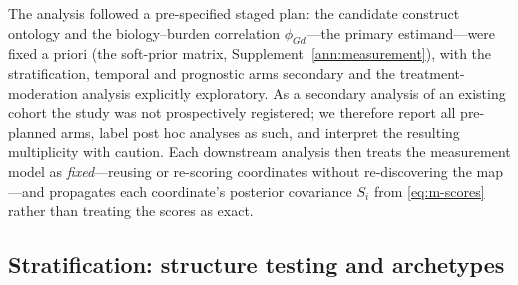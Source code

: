 The analysis followed a pre-specified staged plan: the candidate construct ontology and the
biology--burden correlation $\phi_{Gd}$---the primary estimand---were fixed a priori (the
soft-prior matrix, Supplement~\ref{ann:measurement}), with the stratification, temporal and
prognostic arms secondary and the treatment-moderation analysis explicitly exploratory. As a
secondary analysis of an existing cohort the study was not prospectively registered; we
therefore report all pre-planned arms, label post hoc analyses as such, and interpret the
resulting multiplicity with caution. Each downstream analysis then treats the measurement
model as \emph{fixed}---reusing or re-scoring coordinates without re-discovering the
map---and propagates each coordinate's posterior covariance $S_i$ from \eqref{eq:m-scores}
rather than treating the scores as exact.

\subsection{Stratification: structure testing and archetypes}

